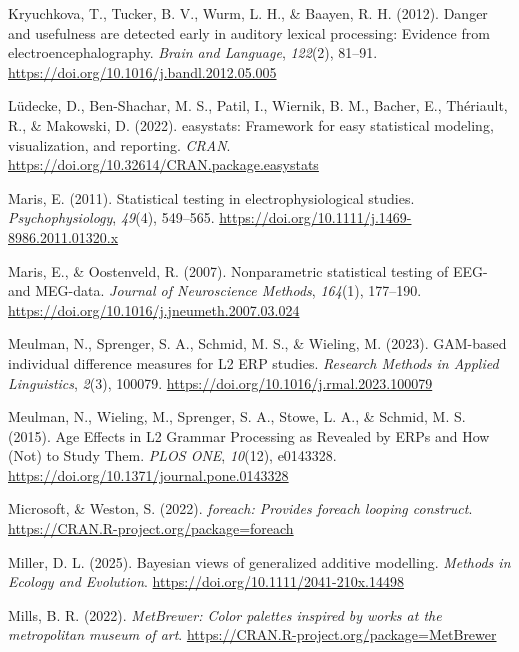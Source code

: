 \documentclass[
  man,
  floatsintext,
  longtable,
  a4paper,
  nolmodern,
  notxfonts,
  notimes,
  colorlinks=true,linkcolor=blue,citecolor=blue,urlcolor=blue]{apa7}
\newlength{\cslhangindent}
\newenvironment{CSLReferences}[2] %
 {\begin{list}{}{%
  \setlength{\itemindent}{0pt}
  \setlength{\leftmargin}{0pt}
  \setlength{\parsep}{0pt}
  \ifodd #1
   \setlength{\leftmargin}{\cslhangindent}
   \setlength{\itemindent}{-1\cslhangindent}
  \fi
  \setlength{\itemsep}{#2\baselineskip}}}
 {\end{list}}
\begin{document}
\begin{CSLReferences}{1}{0}
Kryuchkova, T., Tucker, B. V., Wurm, L. H., \& Baayen, R. H. (2012).
Danger and usefulness are detected early in auditory lexical processing:
Evidence from electroencephalography. \emph{Brain and Language},
\emph{122}(2), 81--91. \url{https://doi.org/10.1016/j.bandl.2012.05.005}

Lüdecke, D., Ben-Shachar, M. S., Patil, I., Wiernik, B. M., Bacher, E.,
Thériault, R., \& Makowski, D. (2022). {easystats}: Framework for easy
statistical modeling, visualization, and reporting. \emph{CRAN}.
\url{https://doi.org/10.32614/CRAN.package.easystats}

Maris, E. (2011). Statistical testing in electrophysiological studies.
\emph{Psychophysiology}, \emph{49}(4), 549--565.
\url{https://doi.org/10.1111/j.1469-8986.2011.01320.x}

Maris, E., \& Oostenveld, R. (2007). Nonparametric statistical testing
of EEG- and MEG-data. \emph{Journal of Neuroscience Methods},
\emph{164}(1), 177--190.
\url{https://doi.org/10.1016/j.jneumeth.2007.03.024}

Meulman, N., Sprenger, S. A., Schmid, M. S., \& Wieling, M. (2023).
GAM-based individual difference measures for L2 ERP studies.
\emph{Research Methods in Applied Linguistics}, \emph{2}(3), 100079.
\url{https://doi.org/10.1016/j.rmal.2023.100079}

Meulman, N., Wieling, M., Sprenger, S. A., Stowe, L. A., \& Schmid, M.
S. (2015). Age Effects in L2 Grammar Processing as Revealed by ERPs and
How (Not) to Study Them. \emph{PLOS ONE}, \emph{10}(12), e0143328.
\url{https://doi.org/10.1371/journal.pone.0143328}

Microsoft, \& Weston, S. (2022). \emph{{foreach}: Provides foreach
looping construct}. \url{https://CRAN.R-project.org/package=foreach}

Miller, D. L. (2025). Bayesian views of generalized additive modelling.
\emph{Methods in Ecology and Evolution}.
\url{https://doi.org/10.1111/2041-210x.14498}

Mills, B. R. (2022). \emph{{MetBrewer}: Color palettes inspired by works
at the metropolitan museum of art}.
\url{https://CRAN.R-project.org/package=MetBrewer}


\end{CSLReferences}
\end{document}
